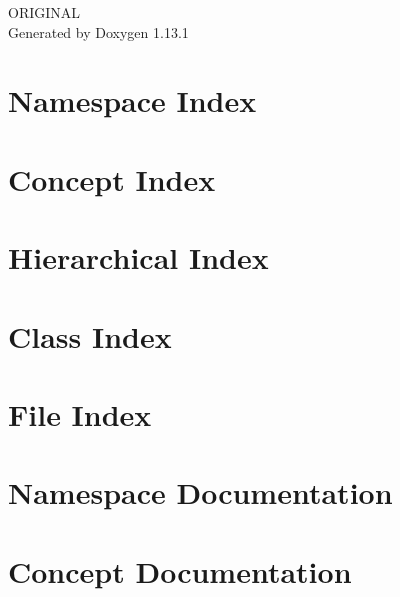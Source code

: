 \documentclass[twoside]{book}
\newcommand{\+}{\discretionary{\mbox{\scriptsize$\hookleftarrow$}}{}{}}
\newcommand{\clearemptydoublepage}{%
    \newpage{\pagestyle{empty}\cleardoublepage}%
  }
\begin{document}
  \raggedbottom
    \hypersetup{pageanchor=false,
                bookmarksnumbered=true,
                pdfencoding=unicode
               }
  \begin{titlepage}
  \vspace*{7cm}
  \begin{center}%
  {\Large ORIGINAL}\\
  \vspace*{1cm}
  {\large Generated by Doxygen 1.13.1}\\
  \end{center}
  \end{titlepage}
  \clearemptydoublepage
  \tableofcontents
  \clearemptydoublepage
  \hypersetup{pageanchor=true}

\chapter{Namespace Index}

\chapter{Concept Index}

\chapter{Hierarchical Index}

\chapter{Class Index}

\chapter{File Index}

\chapter{Namespace Documentation}

\chapter{Concept Documentation}







\end{document}
